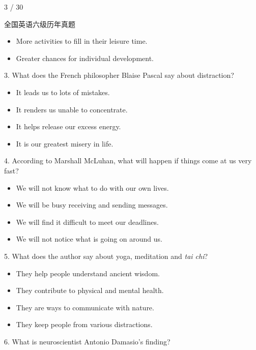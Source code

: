 \documentclass[UTF8,11pt]{ctexart}
\begin{document}
3 / 30


全国英语六级历年真题


\begin{itemize}[leftmargin=2em,itemsep=.2em,topsep=.4em]\item[C.] More activities to fill in their leisure time.
\item[D.] Greater chances for individual development.
\end{itemize}

3. What does the French philosopher Blaise Pascal say about distraction?


\begin{itemize}[leftmargin=2em,itemsep=.2em,topsep=.4em]\item[A.] It leads us to lots of mistakes.
\item[B.] It renders us unable to concentrate.
\item[C.] It helps release our excess energy.
\item[D.] It is our greatest misery in life.
\end{itemize}

4. According to Marshall McLuhan, what will happen if things come at us very fast?


\begin{itemize}[leftmargin=2em,itemsep=.2em,topsep=.4em]\item[A.] We will not know what to do with our own lives.
\item[B.] We will be busy receiving and sending messages.
\item[C.] We will find it difficult to meet our deadlines.
\item[D.] We will not notice what is going on around us.
\end{itemize}

5. What does the author say about yoga, meditation and\textit{ tai chi}?


\begin{itemize}[leftmargin=2em,itemsep=.2em,topsep=.4em]\item[A.] They help people understand ancient wisdom.
\item[B.] They contribute to physical and mental health.
\item[C.] They are ways to communicate with nature.
\item[D.] They keep people from various distractions.
\end{itemize}

6. What is neuroscientist Antonio Damasio’s finding?
\end{document}
